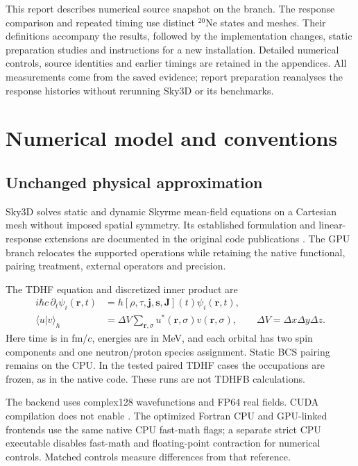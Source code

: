\documentclass[11pt,a4paper]{article}
\newcommand{\Ne}{\texorpdfstring{\ensuremath{^{20}\mathrm{Ne}}}{20Ne}}
\newcommand{\code}[1]{\texttt{\detokenize{#1}}}
\newcommand{\sepsection}[1]{\FloatBarrier\section{#1}}
\begin{document}
This report describes numerical source snapshot \code{9576125} on the
\code{gpu} branch. The response comparison and repeated timing use
distinct \Ne{} states and meshes. Their definitions accompany the
results, followed by the implementation changes, static preparation
studies and instructions for a new installation. Detailed numerical
controls, source identities and earlier timings are retained in the
appendices. All measurements come from the saved evidence; report
preparation reanalyses the response histories without rerunning Sky3D
or its benchmarks.

\sepsection{Numerical model and conventions}
\label{sec:model}
\subsection{Unchanged physical approximation}
Sky3D solves static and dynamic Skyrme mean-field equations on a Cartesian
mesh without imposed spatial symmetry. Its established formulation and
linear-response extensions are documented in the original code publications
\cite{sky3d,sky3d12}. The GPU branch relocates the supported operations while retaining the
native functional, pairing treatment, external operators and precision.

The TDHF equation and discretized inner product are
\begin{align}
 i\hbar c\,\partial_t\psi_i(\mathbf r,t)
 &=h[\rho,\tau,\mathbf j,\mathbf s,\mathbf J](t)\psi_i(\mathbf r,t),\\
 \langle u|v\rangle_h
 &=\Delta V\sum_{\mathbf r,\sigma}u^*(\mathbf r,\sigma)v(\mathbf r,\sigma),
 \qquad \Delta V=\Delta x\Delta y\Delta z.
\end{align}
Here time is in fm/$c$, energies are in MeV, and each orbital has two spin
components and one neutron/proton species assignment. Static BCS pairing
remains on the CPU. In the tested paired TDHF cases the occupations are frozen,
as in the native code. These runs are not TDHFB calculations.

The backend uses complex128 wavefunctions and FP64 real fields. CUDA
compilation does not enable \code{--use_fast_math}. The optimized Fortran
CPU and GPU-linked frontends use the same native CPU fast-math flags; a
separate strict CPU executable disables fast-math and floating-point
contraction for numerical controls. Matched controls measure differences from that reference.
\end{document}
